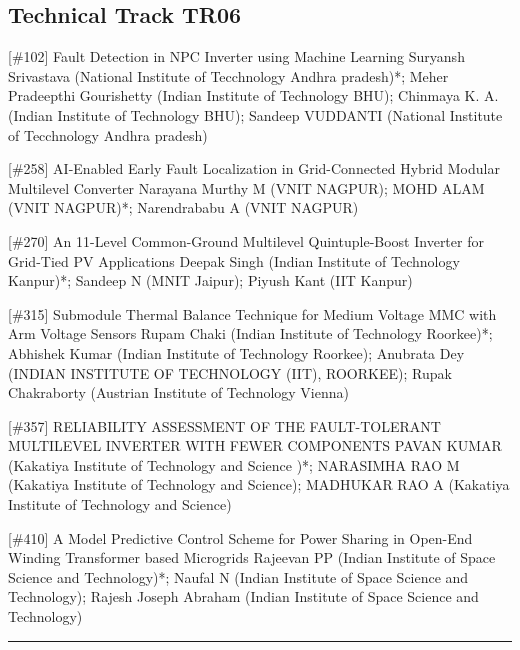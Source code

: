\subsection{Technical Track TR06}\nopagebreak {} \begin{abstract_online} {[\#102] Fault Detection in NPC Inverter using Machine Learning} {} {Suryansh Srivastava (National Institute of Tecchnology Andhra pradesh)*; Meher Pradeepthi Gourishetty (Indian Institute of Technology BHU); Chinmaya K. A. (Indian Institute of Technology BHU); Sandeep VUDDANTI (National Institute of Tecchnology Andhra pradesh)} {}  \end{abstract_online} 
{} \begin{abstract_online} {[\#258] AI-Enabled Early Fault Localization in Grid-Connected Hybrid Modular Multilevel Converter} {} {Narayana Murthy M (VNIT NAGPUR); MOHD ALAM (VNIT NAGPUR)*;  Narendrababu  A (VNIT NAGPUR)} {}  \end{abstract_online} 
{} \begin{abstract_online} {[\#270] An 11-Level Common-Ground Multilevel Quintuple-Boost Inverter for Grid-Tied PV Applications} {} {Deepak Singh (Indian Institute of Technology Kanpur)*; Sandeep N (MNIT Jaipur); Piyush Kant (IIT Kanpur)} {}  \end{abstract_online} 
{} \begin{abstract_online} {[\#315] Submodule Thermal Balance Technique for Medium Voltage MMC with Arm Voltage Sensors} {} {Rupam Chaki (Indian Institute of Technology Roorkee)*; Abhishek  Kumar (Indian Institute of Technology Roorkee); Anubrata Dey (INDIAN INSTITUTE OF TECHNOLOGY (IIT),  ROORKEE); Rupak  Chakraborty (Austrian Institute of Technology Vienna)} {}  \end{abstract_online} 
{} \begin{abstract_online} {[\#357] RELIABILITY ASSESSMENT OF THE  FAULT-TOLERANT MULTILEVEL  INVERTER WITH FEWER COMPONENTS} {} {PAVAN KUMAR (Kakatiya Institute of Technology and Science )*; NARASIMHA RAO M (Kakatiya Institute of Technology and Science); MADHUKAR RAO A (Kakatiya Institute of Technology and Science)} {}  \end{abstract_online} 
{} \begin{abstract_online} {[\#410] A Model Predictive Control Scheme for Power Sharing in Open-End Winding Transformer based Microgrids} {} {Rajeevan PP (Indian Institute of Space Science and Technology)*; Naufal N (Indian Institute of Space Science and Technology); Rajesh Joseph Abraham (Indian Institute of Space Science and Technology)} {}  \end{abstract_online} 
\hrule
